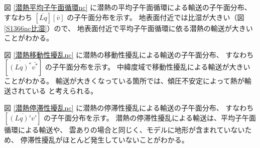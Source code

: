 \documentclass[body]{subfiles}
\begin{document}
\afterpage{\clearpage}

図 \ref{潜熱平均子午面循環nc} に潜熱の平均子午面循環による輸送の子午面分布、
すなわち \([\overline{Lq}][\bar v]\) の子午面分布を示す。
地表面付近では比湿が大きい（図 \ref{S1366nc比湿}）ので、
地表面付近で平均子午面循環に依る潜熱の輸送が大きいことがわかる。

図 \ref{潜熱移動性擾乱nc} に潜熱の移動性擾乱による輸送の子午面分布、
すなわち \([\overline{(Lq)^*}\bar{v^*}]\) の子午面分布を示す。
中緯度域で移動性擾乱による輸送が大きいことがわかる。
輸送が大きくなっている箇所では、傾圧不安定によって熱が輸送されている
と考えられる。

図 \ref{潜熱停滞性擾乱nc} に潜熱の停滞性擾乱による輸送の子午面分布、
すなわち \([\overline{(Lq)'v'}]\) の子午面分布を示す。
潜熱の停滞性擾乱による輸送は、平均子午面循環による輸送や、
雲ありの場合と同じく、モデルに地形が含まれていないため、
停滞性擾乱がほとんど発生していないことがわかる。
\end{document}
